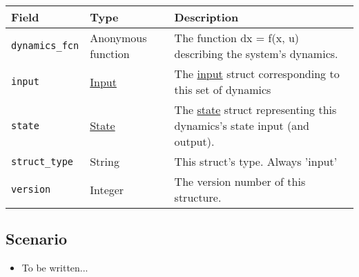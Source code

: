 \documentclass{article}
\begin{document}
			\begin{tabular}{ p{} | p{} | p{}}
				Field                    & Type                               & Description                                            \\ \hline
				\lstinline|dynamics_fcn| & \raggedright Anonymous function    & The function dx = f(x, u) describing the system's
				                                                                dynamics.                                              \\
				\lstinline|input|        & \hyperref[sec:input]{Input}        & The \hyperref[sec:input]{input} struct corresponding
				                                                                to this set of dynamics                                \\
				\lstinline|state|        & \hyperref[sec:state]{State}        & The \hyperref[sec:state]{state} struct representing
				                                                                this dynamics's state input (and output).              \\
				\lstinline|struct_type|  & String                             & This struct's type. Always 'input'                     \\
				\lstinline|version|      & Integer                            & The version number of this structure.                  \\
			\end{tabular}

		\subsection{Scenario}
			\begin{itemize}
				\item To be written... %
			\end{itemize}
\end{document}
